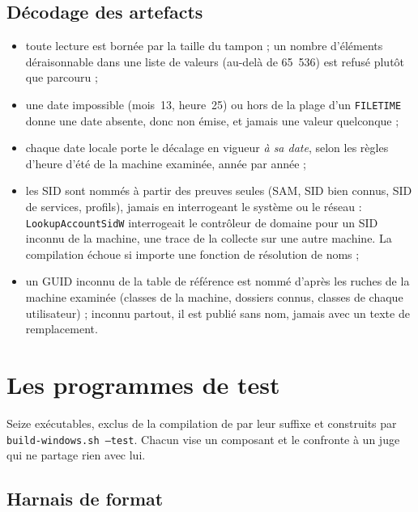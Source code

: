 \documentclass[11pt,a4paper,oneside]{report}
\begin{document}
\section{Décodage des artefacts}

\begin{itemize}
  \item toute lecture est bornée par la taille du tampon ; un nombre
    d'éléments déraisonnable dans une liste de valeurs (au-delà de 65~536) est
    refusé plutôt que parcouru ;
  \item une date impossible (mois~13, heure~25) ou hors de la plage d'un
    \texttt{FILETIME} donne une date absente, donc non émise, et jamais une
    valeur quelconque ;
  \item chaque date locale porte le décalage en vigueur \emph{à sa date},
    selon les règles d'heure d'été de la machine examinée, année par année ;
  \item les SID sont nommés à partir des preuves seules (SAM, SID bien connus,
    SID de services, profils), jamais en interrogeant le système ou le réseau :
    \texttt{LookupAccountSidW} interrogeait le contrôleur de domaine pour un
    SID inconnu de la machine, une trace de la collecte sur une autre machine.
    La compilation échoue si  importe une fonction de
    résolution de noms ;
  \item un GUID inconnu de la table de référence est nommé d'après les ruches
    de la machine examinée (classes de la machine, dossiers connus, classes de
    chaque utilisateur) ; inconnu partout, il est publié sans nom, jamais avec
    un texte de remplacement.
\end{itemize}

\chapter{Les programmes de test}\label{ch:harnais}

Seize exécutables, exclus de la compilation de \wac{} par leur suffixe
 et construits par \texttt{build-windows.sh --test}.
Chacun vise un composant et le confronte à un juge qui ne partage rien avec
lui.

\section{Harnais de format}
\end{document}
